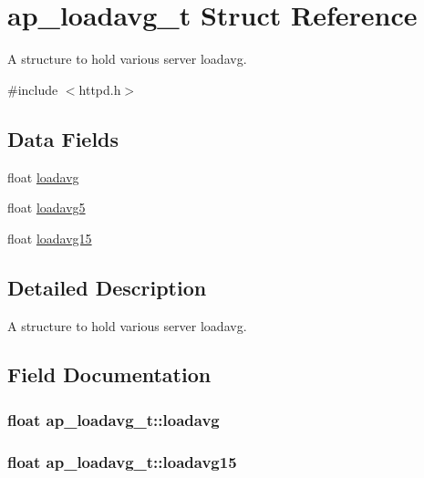 \hypertarget{structap__loadavg__t}{}\section{ap\+\_\+loadavg\+\_\+t Struct Reference}
\label{structap__loadavg__t}


A structure to hold various server loadavg.  




{\ttfamily \#include $<$httpd.\+h$>$}

\subsection*{Data Fields}
\begin{DoxyCompactItemize}
\item 
float \hyperlink{structap__loadavg__t_aa8d7ecce076e86911cba7924f209136c}{loadavg}
\item 
float \hyperlink{structap__loadavg__t_a26e8ad081d9afd8416b47dce84003e12}{loadavg5}
\item 
float \hyperlink{structap__loadavg__t_ab3ccb280095ba8e81b0f9970871db3be}{loadavg15}
\end{DoxyCompactItemize}


\subsection{Detailed Description}
A structure to hold various server loadavg. 

\subsection{Field Documentation}
\subsubsection[{\texorpdfstring{loadavg}{loadavg}}]{\setlength{\rightskip}{0pt plus 5cm}float ap\+\_\+loadavg\+\_\+t\+::loadavg}\hypertarget{structap__loadavg__t_aa8d7ecce076e86911cba7924f209136c}{}\label{structap__loadavg__t_aa8d7ecce076e86911cba7924f209136c}
\subsubsection[{\texorpdfstring{loadavg15}{loadavg15}}]{\setlength{\rightskip}{0pt plus 5cm}float ap\+\_\+loadavg\+\_\+t\+::loadavg15}\hypertarget{structap__loadavg__t_ab3ccb280095ba8e81b0f9970871db3be}{}\label{structap__loadavg__t_ab3ccb280095ba8e81b0f9970871db3be}
